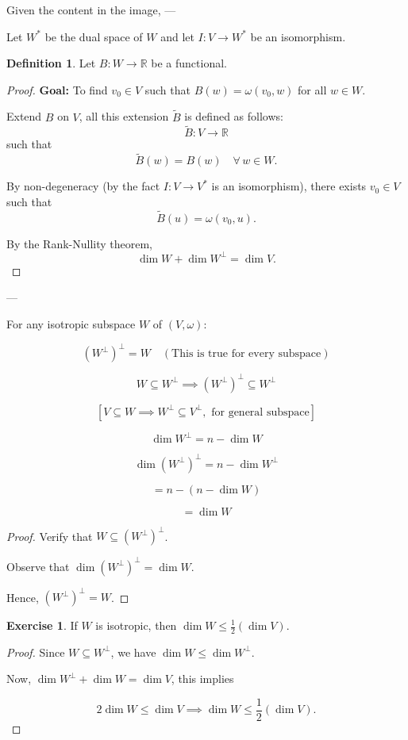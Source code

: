 \documentclass[11pt]{article}
\theoremstyle{definition}
\newtheorem{definition}{Definition}[section]
\newtheorem{exercise}{Exercise}
\theoremstyle{remark}
\begin{document}
Given the content in the image,
---

Let $W^*$ be the dual space of $W$ and let $I: V \to W^*$ be an isomorphism.

\begin{definition}\label{def:B_functional}
    Let $B: W \to \mathbb{R}$ be a functional.
\end{definition}

\begin{proof}
    \textbf{Goal:} To find $v_0 \in V$ such that $B(w) = \omega(v_0, w)$ for all $w \in W$.

    Extend $B$ on $V$, all this extension $\tilde{B}$ is defined as follows:
    \[
    \tilde{B}: V \to \mathbb{R}
    \]
    such that
    \[
    \tilde{B}(w) = B(w) \quad \forall \, w \in W.
    \]

    By non-degeneracy (by the fact $I: V \to V^*$ is an isomorphism), there exists $v_0 \in V$ such that
    \[
    \tilde{B}(u) = \omega(v_0, u).
    \]

    By the Rank-Nullity theorem,
    \[
    \dim W + \dim W^\perp = \dim V.
    \]
\end{proof}

---

For any isotropic subspace \( W \) of \((V, \omega)\):

\[
(W^\perp)^\perp = W \quad (\text{This is true for every subspace})
\]

\[
W \subseteq W^\perp \implies (W^\perp)^\perp \subseteq W^\perp
\]

\[
[V \subseteq W \implies W^\perp \subseteq V^\perp, \text{ for general subspace}]
\]

\[
\dim W^\perp = n - \dim W
\]

\[
\dim (W^\perp)^\perp = n - \dim W^\perp
\]

\[
= n - (n - \dim W)
\]

\[
= \dim W
\]

\begin{proof}
Verify that \( W \subseteq (W^\perp)^\perp \).

Observe that \(\dim (W^\perp)^\perp = \dim W\).

Hence, \((W^\perp)^\perp = W\).
\end{proof}

\begin{exercise}
If \( W \) is isotropic, then \(\dim W \leq \frac{1}{2} (\dim V)\).

\begin{proof}
Since \( W \subseteq W^\perp \), we have \(\dim W \leq \dim W^\perp\).

Now, \(\dim W^\perp + \dim W = \dim V\), this implies

\[
2 \dim W \leq \dim V \implies \dim W \leq \frac{1}{2} (\dim V).
\]
\end{proof}
\end{exercise}
\end{document}
